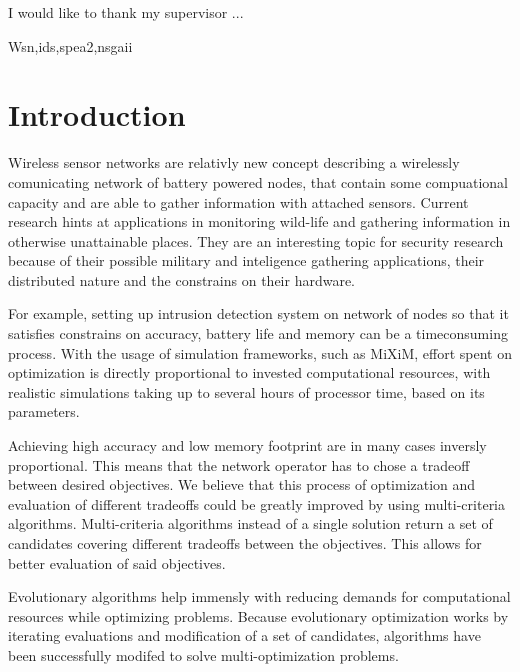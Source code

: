 \documentclass[12pt,oneside]{fithesis2}
\begin{document}
\FrontMatter
\ThesisTitlePage
\begin{ThesisDeclaration}
\DeclarationText
\AdvisorName
\end{ThesisDeclaration}
\begin{ThesisThanks}
I would like to thank my supervisor ...
\end{ThesisThanks}
\begin{ThesisAbstract}
\end{ThesisAbstract}
 
\begin{ThesisKeyWords}
Wsn,ids,spea2,nsgaii
\end{ThesisKeyWords}

\tableofcontents %

\MainMatter
\chapter{Introduction}
\label{chap:intro}
Wireless sensor networks are relativly new concept describing a wirelessly comunicating network of battery powered nodes, that contain some compuational capacity and are able to gather information with attached sensors. Current research hints at applications in monitoring wild-life and gathering information in otherwise unattainable places. They are an interesting topic for security research because of their possible military and inteligence gathering applications, their distributed nature and the constrains on their hardware. 

For example, setting up intrusion detection system on network of nodes so that it satisfies constrains on accuracy, battery life and memory can be a timeconsuming process. With the usage of simulation frameworks, such as MiXiM, effort spent on optimization is directly proportional to invested computational resources, with realistic simulations taking up to several hours of processor time, based on its parameters.

Achieving high accuracy and low memory footprint are in many cases inversly proportional. This means that the network operator has to chose a tradeoff between desired objectives.  We believe that this process of optimization and evaluation of different tradeoffs could be greatly improved by using multi-criteria algorithms. Multi-criteria algorithms instead of a single solution return a set of candidates covering different tradeoffs between the objectives. This allows for better evaluation of said objectives.

Evolutionary algorithms help immensly with reducing demands for computational resources while optimizing problems. Because evolutionary optimization works by iterating evaluations and modification of a set of candidates, algorithms have been successfully modifed to solve multi-optimization problems.
\end{document}
